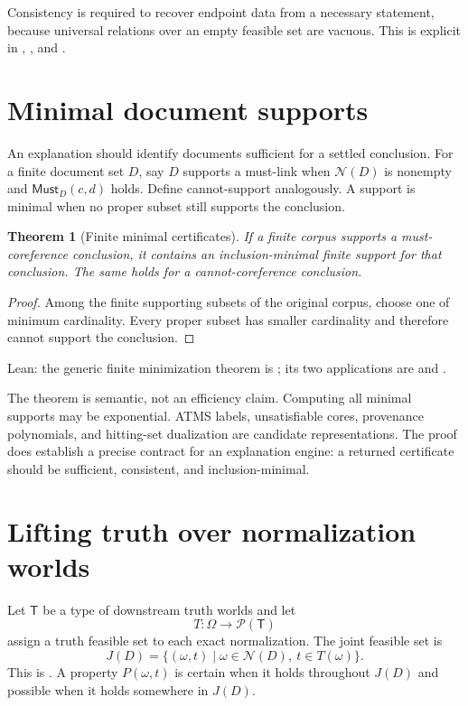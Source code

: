 \documentclass[11pt]{article}
\newtheorem{theorem}{Theorem}[section]
\theoremstyle{definition}
\theoremstyle{remark}
\newcommand{\Pow}{\mathcal P}
\newcommand{\Hyp}{\Omega}
\newcommand{\Feas}{\mathcal N}
\newcommand{\Must}{\mathsf{Must}}
\begin{document}
Consistency is required to recover endpoint data from a necessary statement,
because universal relations over an empty feasible set are vacuous.  This is
explicit in , , and
.

\section{Minimal document supports}

An explanation should identify documents sufficient for a settled conclusion.
For a finite document set $D$, say $D$ supports a must-link when $\Feas(D)$ is
nonempty and $\Must_D(c,d)$ holds.  Define cannot-support analogously.  A
support is minimal when no proper subset still supports the conclusion.

\begin{theorem}[Finite minimal certificates]
If a finite corpus supports a must-coreference conclusion, it contains an
inclusion-minimal finite support for that conclusion.  The same holds for a
cannot-coreference conclusion.
\end{theorem}
\begin{proof}
Among the finite supporting subsets of the original corpus, choose one of
minimum cardinality.  Every proper subset has smaller cardinality and therefore
cannot support the conclusion.
\end{proof}
\noindent Lean: the generic finite minimization theorem is
; its two applications are
 and
.

The theorem is semantic, not an efficiency claim.  Computing all minimal
supports may be exponential.  ATMS labels, unsatisfiable cores, provenance
polynomials, and hitting-set dualization are candidate representations.  The
proof does establish a precise contract for an explanation engine: a returned
certificate should be sufficient, consistent, and inclusion-minimal.

\section{Lifting truth over normalization worlds}\label{sec:truth}

Let $\mathsf T$ be a type of downstream truth worlds and let
\[
  T:\Hyp\longrightarrow\Pow(\mathsf T)
\]
assign a truth feasible set to each exact normalization.  The joint feasible
set is
\[
  J(D)=\{(\omega,t)\mid \omega\in\Feas(D),\ t\in T(\omega)\}.
\]
This is .  A property $P(\omega,t)$ is certain
when it holds throughout $J(D)$ and possible when it holds somewhere in
$J(D)$.
\end{document}
